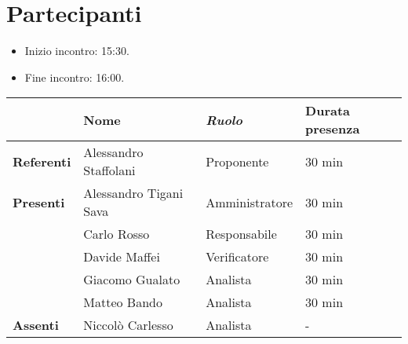\section*{Partecipanti}

\begin{itemize}
	\item Inizio incontro: 15:30.
	\item Fine incontro: 16:00.
\end{itemize}


\begin{center}
	{\renewcommand{\arraystretch}{1.5}
		\begin{tabular}{l|lll}
			                   & \textbf{Nome}          & \textit{Ruolo} & \textbf{Durata presenza} \\
			\hline
			\textbf{Referenti} & Alessandro Staffolani  & Proponente     & 30 min                   \\
			\hline
			\textbf{Presenti}  & Alessandro Tigani Sava & Amministratore & 30 min                   \\
			                   & Carlo Rosso            & Responsabile   & 30 min                   \\
			                   & Davide Maffei          & Verificatore   & 30 min                   \\
			                   & Giacomo Gualato        & Analista       & 30 min                   \\
			                   & Matteo Bando           & Analista       & 30 min                   \\
			\hline
			\textbf{Assenti}   & Niccolò Carlesso       & Analista       & -                        \\
		\end{tabular}
	}
\end{center}
